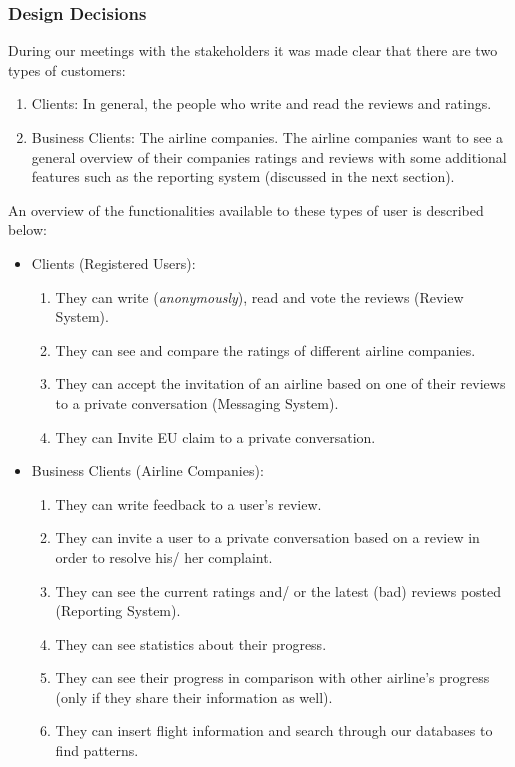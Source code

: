 \documentclass{article}
\begin{document}
\subsubsection{Design Decisions}
During our meetings with the stakeholders it was made clear that there are two types of customers:
\begin{enumerate} 
\item Clients: In general, the people who write and read the reviews and ratings.
\item Business Clients: The airline companies. The airline companies want to see a general overview of their companies ratings and reviews with some additional features such as the 
reporting system (discussed in the next section).
\end{enumerate}

An overview of the functionalities available to these types of user is described below: 
\begin{itemize}
\item Clients (Registered Users):
	\begin{enumerate}
		\item They can write ({\em anonymously}), read and vote the reviews (Review System).
        \item They can see and compare the ratings of different airline companies.
        \item They can accept the invitation of an airline based on one of their reviews to a private conversation (Messaging System). 
		\item They can Invite EU claim to a private conversation.
	\end{enumerate}
\item Business Clients (Airline Companies):
	\begin{enumerate}
		\item They can write feedback to a user's review.
		\item They can invite a user to a private conversation based on a review in order to resolve his/ her complaint.
		\item They can see the current ratings and/ or the latest (bad) reviews posted (Reporting System).
		\item They can see statistics about their progress.
		\item They can see their progress in comparison with other airline's progress (only if they share their information as well).
		\item They can insert flight information and search through our databases to find patterns.
	\end{enumerate}
\end{itemize}
\end{document}
